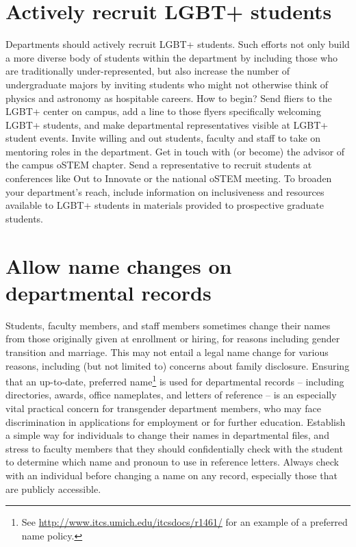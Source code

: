 \section {Actively recruit LGBT+ students}
\label{recruit-students}
Departments should actively recruit LGBT+ students. Such efforts not only build a more diverse body of students within the department by including those who are traditionally under-represented, but also increase the number of undergraduate majors by inviting students who might not otherwise think of physics and astronomy as hospitable careers. How to begin?  Send fliers to the LGBT+ center on campus, add a line to those flyers specifically welcoming LGBT+ students, and make departmental representatives visible at LGBT+ student events.  Invite willing and out students, faculty and staff to take on mentoring roles in the department.  Get in touch with (or become) the advisor of the campus oSTEM chapter.  Send a representative to recruit students at conferences like Out to Innovate or the national oSTEM meeting.  To broaden your department's reach, include information on inclusiveness and resources available to LGBT+ students in materials provided to prospective graduate students. 

\section {Allow name changes on departmental records}
\label{name-changes}
Students, faculty members, and staff members sometimes change their names from those originally given at enrollment or hiring, for reasons including gender transition and marriage. This may not entail a legal name change for various reasons, including (but not limited to) concerns about family disclosure. Ensuring that an up-to-date, preferred name\footnote{See \href{http://www.itcs.umich.edu/itcsdocs/r1461/}{http://www.itcs.umich.edu/itcsdocs/r1461/} for an example of a preferred name policy.} is used for departmental records -- including directories, awards, office nameplates, and letters of reference -- is an especially vital practical concern for transgender department members, who may face discrimination in applications for employment or for further education. Establish a simple way for individuals to change their names in departmental files, and stress to faculty members that they should confidentially check with the student to determine which name and pronoun to use in reference letters. Always check with an individual before changing a name on any record, especially those that are publicly accessible.


